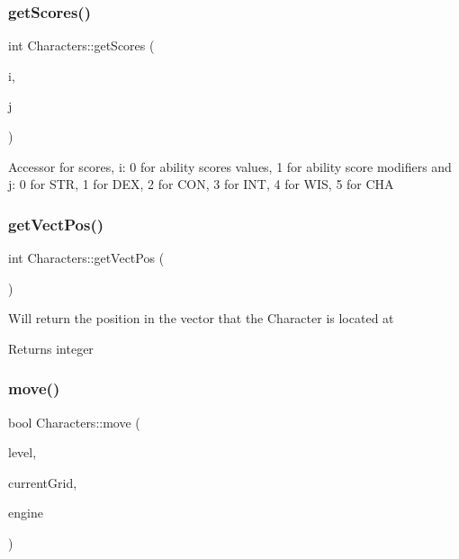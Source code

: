 \subsubsection{\texorpdfstring{get\+Scores()}{getScores()}}
{\footnotesize\ttfamily int Characters\+::get\+Scores (\begin{DoxyParamCaption}\item[{int}]{i,  }\item[{int}]{j }\end{DoxyParamCaption})}

Accessor for scores, i\+: 0 for ability scores values, 1 for ability score modifiers and j\+: 0 for S\+TR, 1 for D\+EX, 2 for C\+ON, 3 for I\+NT, 4 for W\+IS, 5 for C\+HA \hypertarget{class_characters_adb4cb606374d17c34f17846809306f91}{}\label{class_characters_adb4cb606374d17c34f17846809306f91} 
\subsubsection{\texorpdfstring{get\+Vect\+Pos()}{getVectPos()}}
{\footnotesize\ttfamily int Characters\+::get\+Vect\+Pos (\begin{DoxyParamCaption}{ }\end{DoxyParamCaption})}

Will return the position in the vector that the Character is located at \begin{DoxyReturn}{Returns}
integer 
\end{DoxyReturn}
\hypertarget{class_characters_a2e5007e526b373bc2db936a6034c5064}{}\label{class_characters_a2e5007e526b373bc2db936a6034c5064} 
\subsubsection{\texorpdfstring{move()}{move()}}
{\footnotesize\ttfamily bool Characters\+::move (\begin{DoxyParamCaption}\item[{\hyperlink{class_pre_built_level}{Pre\+Built\+Level} $\ast$}]{level,  }\item[{S\+D\+L\+\_\+\+Rect $\ast$}]{current\+Grid,  }\item[{\hyperlink{class_game_play_engine}{Game\+Play\+Engine} $\ast$}]{engine }\end{DoxyParamCaption})\hspace{0.3cm}{\ttfamily [virtual]}}

